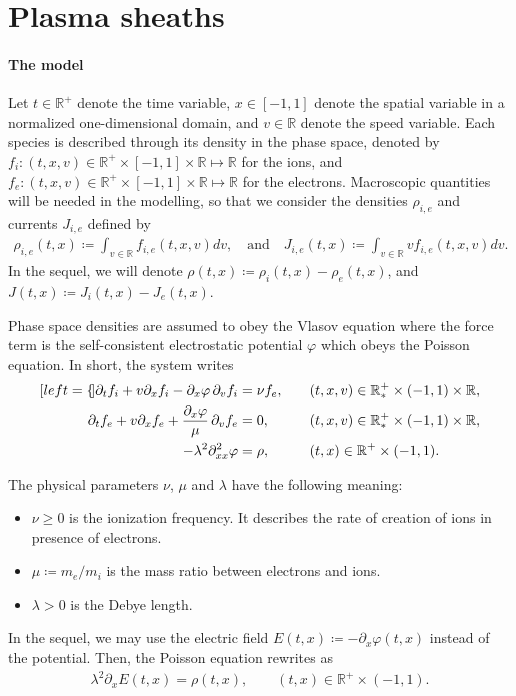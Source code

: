 \documentclass{article}
\numberwithin{equation}{section}
\newcommand{\R}{\mathbb{R}}
\newcommand{\mysubeq}[2]{ %
	\begin{subequations}\label{#1}
		\begin{align}[left = {\empheqlbrace}]
			#2
		\end{align}
	\end{subequations}	
}
\begin{document}
\section{Plasma sheaths}\label{sec:model}

\paragraph{The model}

Let $t\in\mathbb{R}^+$ denote the time variable, $x\in [-1,1]$ denote the spatial variable in a normalized one-dimensional domain, and $v\in\mathbb{R}$ denote the speed variable. Each species is described through its density in the phase space, denoted by $f_i : (t,x,v) \in \R^+ \times [-1,1]\times \R \mapsto \R$ for the ions, and $f_e : (t,x,v) \in \R^+ \times [-1,1]\times \R \mapsto \R$ for the electrons. Macroscopic quantities will be needed in the modelling, so that we consider the densities $\rho_{i,e}$ and currents $J_{i,e}$ defined by
\begin{align}\label{eq:def_ni_ne}
	\rho_{i,e} (t,x) \coloneqq \int_{v\in\R} f_{i,e} (t,x,v) dv, \quad\text{and}\quad J_{i,e} (t,x) \coloneqq \int_{v\in\R} v f_{i,e} (t,x,v) dv. 
\end{align}
In the sequel, we will denote $\rho (t,x) \coloneqq \rho_i (t,x) - \rho_e(t,x)$, and $J(t,x) \coloneqq J_i(t,x) - J_e(t,x)$.

Phase space densities are assumed to obey the Vlasov equation where the force term is the self-consistent electrostatic potential $\varphi$ which obeys the Poisson equation. In short, the system writes
\mysubeq{eq:unsta_model}{
	\partial_t f_i + v \partial_x f_i - \partial_x \varphi \, \partial_v f_i &= \nu f_e, && (t,x,v) \in \R_{*}^{+} \times (-1,1) \times \R, \label{eq:unsta_model_fi} \\
	\partial_t f_e + v \partial_x f_e + \frac{\partial_x \varphi }{\mu}\, \partial_v f_e &= 0, \quad\quad && (t,x,v) \in \R_{*}^{+} \times (-1,1) \times \R, \label{eq:unsta_model_fe} \\
	- \lambda^2 \partial^2_{xx} \varphi &= \rho, && (t,x) \in \R^{+} \times (-1,1). \label{eq:unsta_model_phi}
}
The physical parameters $\nu$, $\mu$ and $\lambda$ have the following meaning:
\begin{itemize}
\item $\nu \geqslant 0$ is the ionization frequency. It describes the rate of creation %
of ions in presence of electrons.
\item $\mu \coloneqq m_e / m_i$ is the mass ratio between electrons and ions.
\item $\lambda > 0$ is the Debye length.
\end{itemize}
In the sequel, we may use the electric field $E(t,x) \coloneqq - \partial_x \varphi(t,x)$ instead of the potential. Then, the Poisson equation rewrites as 
\begin{align}
	\lambda^2 \partial_x E (t,x) = \rho(t,x), \quad \quad (t,x) \in \R^{+} \times (-1,1). \label{eq:unsta_model_E}
\end{align}
\end{document}
